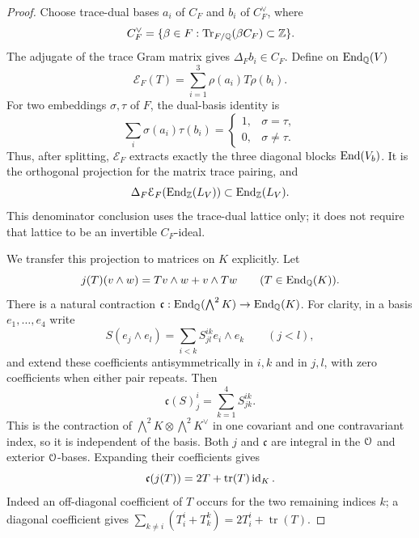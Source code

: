 \begin{proof}
Choose trace-dual bases \(a_i\) of \(C_F\) and \(b_i\) of \(C_F^\vee\),
where
\[
 C_F^\vee=\{\beta\in F:\operatorname{Tr}_{F/\mathbb Q}(\beta C_F)\subset\mathbb Z\}.
\]
The adjugate of the trace Gram matrix gives
\(\Delta_F b_i\in C_F\).  Define on \(\operatorname{End}_\mathbb Q(V)\)
\begin{equation}
 \mathcal E_F(T)=\sum_{i=1}^3\rho(a_i)T\rho(b_i).
 \label{eq:ext-centralizer-projection}
\end{equation}
For two embeddings \(\sigma,\tau\) of \(F\), the dual-basis identity is
\[
 \sum_i\sigma(a_i)\tau(b_i)=
 \begin{cases}1,&\sigma=\tau,\\0,&\sigma\ne\tau.\end{cases}
\]
Thus, after splitting, \(\mathcal E_F\) extracts exactly the three
diagonal blocks \(\operatorname{End}(V_b)\).  It is the orthogonal projection
for the matrix trace pairing, and
\begin{equation}
 \Delta_F\mathcal E_F(\operatorname{End}_\mathbb Z(L_V))\subset\operatorname{End}_\mathbb Z(L_V).
 \label{eq:ext-centralizer-denominator}
\end{equation}
This denominator conclusion uses the trace-dual lattice only; it
does not require that lattice to be an invertible \(C_F\)-ideal.

We transfer this projection to matrices on \(K\) explicitly.
Let
\[
 j(T)(v\wedge w)=Tv\wedge w+v\wedge Tw
 \qquad(T\in\operatorname{End}_\mathbb Q(K)).
\]
There is a natural contraction
\(\mathfrak c:\operatorname{End}_\mathbb Q(\bigwedge^2K)\to\operatorname{End}_\mathbb Q(K)\).
For clarity, in a basis \(e_1,\ldots,e_4\) write
\[
 S(e_j\wedge e_l)=\sum_{i<k}S^{ik}_{jl}e_i\wedge e_k\qquad(j<l),
\]
and extend these coefficients antisymmetrically in \(i,k\) and in
\(j,l\), with zero coefficients when either pair repeats.  Then
\[
 \mathfrak c(S)^i_j=\sum_{k=1}^4 S^{ik}_{jk}.
\]
This is the contraction of
\(\bigwedge^2K\otimes\bigwedge^2K^\vee\) in one covariant and one
contravariant index, so it is independent of the basis.  Both \(j\)
and \(\mathfrak c\) are integral in the \(\mathcal O\) and exterior
\(\mathcal O\)-bases.  Expanding their coefficients gives
\begin{equation}
 \mathfrak c(j(T))=2T+\operatorname{tr}(T)\operatorname{id}_K.
 \label{eq:ext-contraction}
\end{equation}
Indeed an off-diagonal coefficient of \(T\) occurs for the two
remaining indices \(k\); a diagonal coefficient gives
\(\sum_{k\ne i}(T^i_i+T^k_k)=2T^i_i+\operatorname{tr}(T)\).


\end{proof}
